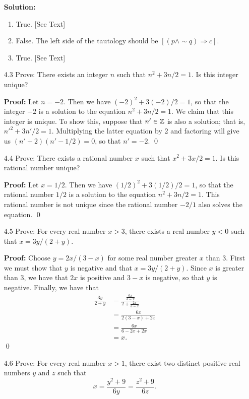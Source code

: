 \begin{enumerate}
      \textbf{Solution:}

      \begin{enumerate}
         \item True. [See Text]
         \item False. The left side of the tautology should be
               $[(p \land {\sim}q) \Rightarrow c]$.
         \item True. [See Text]
      \end{enumerate}
   \item[4.3]  Prove: There exists an integer $n$ such that $n^2 + 3n/2 = 1$. Is
               this integer unique?
			
		\textbf{Proof:} Let $n = -2$. Then we have $(-2)^2 + 3(-2)/2 = 1$, so that
		the integer $-2$ is a solution to the equation $n^2 + 3n/2 = 1$. We claim
		that this integer is unique. To show this, suppose that $n' \in \mathbb{Z}$ is
		also a solution; that is, $n'^2 + 3n'/2 = 1$. Multiplying the latter
		equation by 2 and factoring will give us $(n' + 2)(n' - 1/2)= 0$, so that
		$n' = -2$. \qed
   \item[4.4]  Prove: There exists a rational number $x$ such that
               $x^2 + 3x/2 = 1$. Is this rational number unique?
			
		\textbf{Proof:} Let $x = 1/2$. Then we have $(1/2)^2 + 3(1/2)/2 = 1$, so
		that the rational number $1/2$ is a solution to the equation
		$n^2 + 3n/2 = 1$. This rational number is not unique since the rational
		number $-2/1$ also solves the equation. \qed
   \item[4.5]  Prove: For every real number $x > 3$, there exists a real number
               $y < 0$ such that $x = 3y/(2 + y)$.
					
		\textbf{Proof:} Choose $y = 2x/(3-x)$ for some real number greater $x$
		than 3. First we must show that $y$ is negative and that $x = 3y/(2 + y)$.
		Since $x$ is greater than 3, we have that $2x$ is positive and $3 - x$ is
		negative, so that $y$ is negative. Finally, we have that
		\begin{align*}
			\frac{3y}{2 + y} &= \frac{\frac{6x}{3 - x}}{2 + \frac{2x}{3 - x}} \\
								  &= \frac{6x}{2(3 - x) + 2x} \\
								  &= \frac{6x}{6 - 2x + 2x} \\
								  &= x.
		\end{align*} \qed
   \item[4.6]  Prove: For every real number $x > 1$, there exist two distinct
               positive real numbers $y$ and $z$ such that
               $$x = \frac{y^2 + 9}{6y} = \frac{z^2 + 9}{6z}.$$
					

\end{enumerate}
